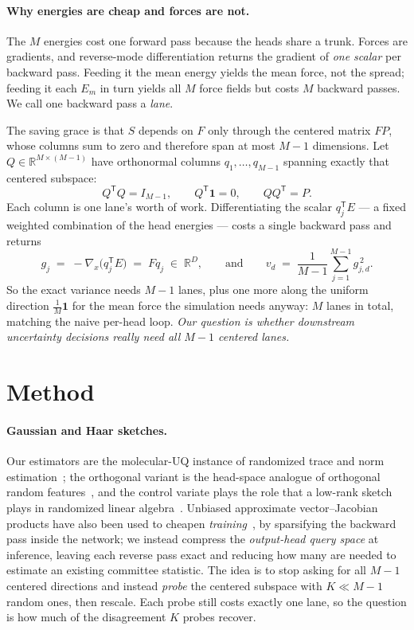 \documentclass{article}
\begin{document}
\paragraph{Why energies are cheap and forces are not.}
The $M$ energies cost one forward pass because the heads share a trunk. Forces are gradients, and
reverse-mode differentiation returns the gradient of \emph{one scalar} per backward pass. Feeding it
the mean energy yields the mean force, not the spread; feeding it each $E_m$ in turn yields all $M$
force fields but costs $M$ backward passes. We call one backward pass a \emph{lane}.

The saving grace is that $S$ depends on $F$ only through the centered matrix $FP$, whose columns sum
to zero and therefore span at most $M-1$ dimensions. Let $Q\in\mathbb{R}^{M\times(M-1)}$ have
orthonormal columns $q_1,\dots,q_{M-1}$ spanning exactly that centered subspace:
\begin{equation*}
Q^{\mathsf T}Q=I_{M-1},\qquad Q^{\mathsf T}\mathbf 1=0,\qquad QQ^{\mathsf T}=P .
\end{equation*}
Each column is one lane's worth of work. Differentiating the scalar $q_j^{\mathsf T}E$ --- a fixed
weighted combination of the head energies --- costs a single backward pass and returns
\begin{equation}
g_j\;=\;-\nabla_x\bigl(q_j^{\mathsf T}E\bigr)\;=\;Fq_j\;\in\;\mathbb{R}^{D},
\qquad\text{and}\qquad
v_d\;=\;\frac{1}{M-1}\sum_{j=1}^{M-1} g_{j,d}^{\,2} .
\end{equation}
So the exact variance needs $M-1$ lanes, plus one more along the uniform direction
$\tfrac1M\mathbf 1$ for the mean force the simulation needs anyway: $M$ lanes in total, matching the
naive per-head loop. \emph{Our question is whether downstream uncertainty decisions really need all
$M-1$ centered lanes.}

\section{Method}
\label{sec:method}
\paragraph{Gaussian and Haar sketches.}
Our estimators are the molecular-UQ instance of randomized trace and norm
estimation~\citep{hutchinson,avron2011,hutchpp}; the orthogonal variant is the head-space analogue of
orthogonal random features~\citep{yu2016orf}, and the control variate plays the role that a low-rank
sketch plays in randomized linear algebra~\citep{halko2011}. Unbiased approximate vector--Jacobian
products have also been used to cheapen \emph{training}~\citep{bakong2026vjp}, by sparsifying the
backward pass inside the network; we instead compress the \emph{output-head query space} at
inference, leaving each reverse pass exact and reducing how many are needed to estimate an existing
committee statistic.
The idea is to stop asking for all $M-1$ centered directions and instead \emph{probe} the centered
subspace with $K\ll M-1$ random ones, then rescale. Each probe still costs exactly one lane, so the
question is how much of the disagreement $K$ probes recover.
\end{document}
